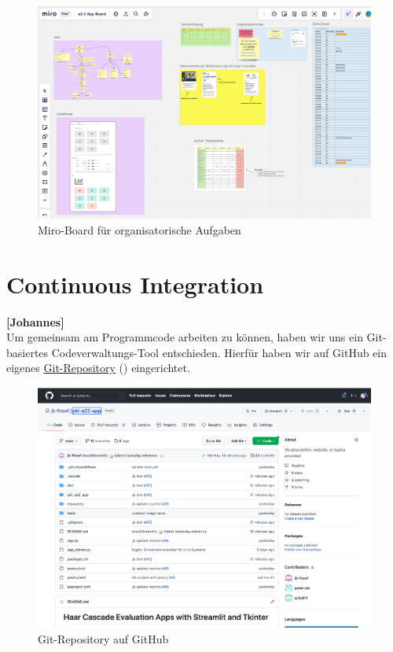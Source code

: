 \begin{figure}[ht]
	\includegraphics[scale=0.25]{../images/miro_board.png}
	\caption{Miro-Board für organisatorische Aufgaben}
	\label{fig:miro}
\end{figure}

\newpage

\section{Continuous Integration}

\textbf{[Johannes]} \\

Um gemeinsam am Programmcode arbeiten zu können, haben wir uns ein Git-basiertes 
Codeverwaltungs-Tool entschieden. Hierfür haben wir auf GitHub ein eigenes
\href{https://github.com/jk-fhswf/pki-a22-app}{Git-Repository} () eingerichtet.


\begin{figure}[!h]
 	\includegraphics[scale=0.25]{../images/ci_git.png}
 	\caption{Git-Repository auf GitHub}
	\label{fig:git}	
\end{figure}

